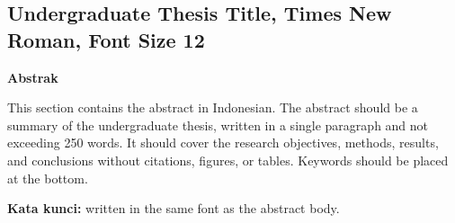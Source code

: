 \begin{singlespace}
\chapter*{\large Undergraduate Thesis Title, Times New Roman, Font Size 12}
\begin{center}
    \textbf{Abstrak}
\end{center}
This section contains the abstract in Indonesian. The abstract should be a summary of the undergraduate thesis, written in a single paragraph and not exceeding 250 words. It should cover the research objectives, methods, results, and conclusions without citations, figures, or tables. Keywords should be placed at the bottom.

\vspace{0.5cm}
\noindent \textbf{Kata kunci:} written in the same font as the abstract body.
\end{singlespace}
